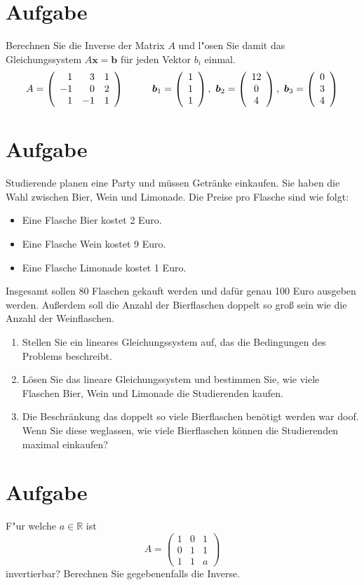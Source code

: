\documentclass[fontsize=11pt, parskip=half]{scrartcl}
\newcommand{\R}{\mathbb{R}}
\newcommand{\three}[3]{\left(\begin{array}{c}#1\\#2\\#3\end{array}\right)}
\renewcommand{\vec}[1]{\boldsymbol #1}
\begin{document}
\section{Aufgabe} Berechnen Sie die Inverse der Matrix $A$ und l"osen Sie damit
das Gleichungssystem $A \vec{x}=\vec{b}$ für jeden Vektor $b_i$
einmal.
\[A= \left( \begin{array}{rrr} 1 & 3 & 1 \\
-1 & 0 & 2 \\ 1 & -1 & 1 \end{array} \right) \hspace{10mm}
\vec{b_1}=\three{1}{1}{1}, \ \vec{b_2}=\three{12}{0}{4}, \
\vec{b_3}=\three{0}{3}{4} \]


\section{Aufgabe}
Studierende planen eine Party und müssen Getränke einkaufen. Sie haben die Wahl zwischen Bier, Wein und Limonade. Die Preise pro Flasche sind wie folgt:

\begin{itemize}
    \item Eine Flasche Bier kostet 2 Euro.
    \item Eine Flasche Wein kostet 9 Euro.
    \item Eine Flasche Limonade kostet 1 Euro.
\end{itemize}

Insgesamt sollen 80 Flaschen gekauft werden und dafür genau 100 Euro ausgeben werden. Außerdem soll die Anzahl der Bierflaschen doppelt so groß sein wie die Anzahl der Weinflaschen.

\begin{enumerate}[label=\alph*)]
    \item Stellen Sie ein lineares Gleichungssystem auf, das die Bedingungen des Problems beschreibt.
    \item Lösen Sie das lineare Gleichungssystem und bestimmen Sie, wie viele Flaschen Bier, Wein und Limonade die Studierenden kaufen.
    \item Die Beschränkung das doppelt so viele Bierflaschen benötigt werden war doof. Wenn Sie diese weglassen, wie viele Bierflaschen können die Studierenden maximal einkaufen?
\end{enumerate}

%

\section{Aufgabe} F"ur welche $a \in \R$ ist
\[ A= \left( \begin{array}{rrr} 1 & 0 & 1 \\
0 & 1 & 1 \\ 1 & 1 & a \end{array} \right) \] invertierbar?
Berechnen Sie gegebenenfalls die Inverse.
\end{document}
